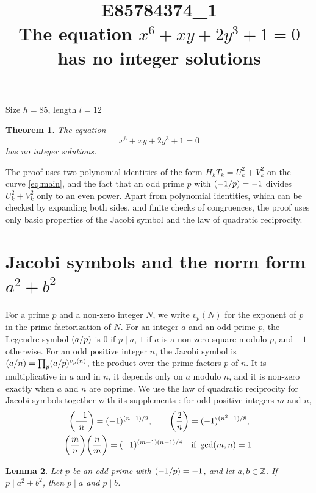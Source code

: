 \documentclass[11pt]{article}
\title{\textbf{E85784374\_1}\\[4pt] {\Large The equation $x^{6}+xy+2y^{3}+1=0$ has no integer solutions}}
\author{}
\date{}
\newtheorem{theorem}{Theorem}
\newtheorem{lemma}[theorem]{Lemma}
\newcommand{\Z}{\mathbb{Z}}
\newcommand{\leg}[2]{\mathchoice{\biggl(\dfrac{#1}{#2}\biggr)}{(#1/#2)}{(#1/#2)}{(#1/#2)}}
\begin{document}
\maketitle
\vspace{-8ex}
\begin{center}
Size $h=85$, length $l=12$
\end{center}

\begin{theorem}\label{thm:main}
The equation
\begin{equation}\label{eq:main}
x^{6}+xy+2y^{3}+1=0
\end{equation}
has no integer solutions.
\end{theorem}

The proof uses two polynomial identities of the form $H_kT_k=U_k^2+V_k^2$ on the curve \eqref{eq:main}, and the fact that an odd prime $p$ with $\leg{-1}{p}=-1$ divides $U_k^2+V_k^2$ only to an even power. Apart from polynomial identities, which can be checked by expanding both sides, and finite checks of congruences, the proof uses only basic properties of the Jacobi symbol and the law of quadratic reciprocity.

\section{\texorpdfstring{Jacobi symbols and the norm form $a^2+b^2$}{Jacobi symbols and the norm form}}

For a prime $p$ and a non-zero integer $N$, we write $v_p(N)$ for the exponent of $p$ in the prime factorization of $N$. For an integer $a$ and an odd prime $p$, the Legendre symbol $\leg{a}{p}$ is $0$ if $p\mid a$, $1$ if $a$ is a non-zero square modulo $p$, and $-1$ otherwise. For an odd positive integer $n$, the Jacobi symbol is $\leg{a}{n}=\prod_p\leg{a}{p}^{v_p(n)}$, the product over the prime factors $p$ of $n$. It is multiplicative in $a$ and in $n$, it depends only on $a$ modulo $n$, and it is non-zero exactly when $a$ and $n$ are coprime. We use the law of quadratic reciprocity for Jacobi symbols together with its supplements \cite[Chapter~5, \S2]{IR}: for odd positive integers $m$ and $n$,
\begin{gather*}
\leg{-1}{n}=(-1)^{(n-1)/2},\qquad\leg{2}{n}=(-1)^{(n^2-1)/8},\\
\leg{m}{n}\leg{n}{m}=(-1)^{(m-1)(n-1)/4}\quad\text{if }\gcd(m,n)=1.
\end{gather*}

\begin{lemma}\label{lem:divides}
Let $p$ be an odd prime with $\leg{-1}{p}=-1$, and let $a,b\in\Z$. If $p\mid a^2+b^2$, then $p\mid a$ and $p\mid b$.
\end{lemma}
\end{document}
